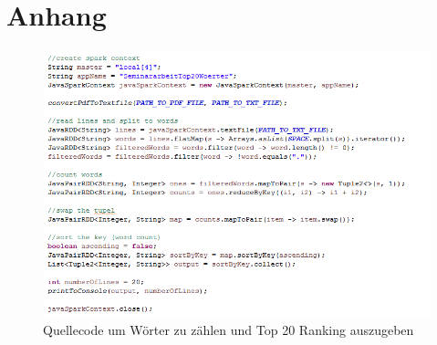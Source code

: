 \newpage
\chapter{Anhang} 


\begin{figure}[h]
  \centering
  \includegraphics[width=\textwidth]{./bilder/listing_top20.PNG}
  \caption{Quellecode um Wörter zu zählen und Top 20 Ranking auszugeben}\label{code:wordcount}
\end{figure}